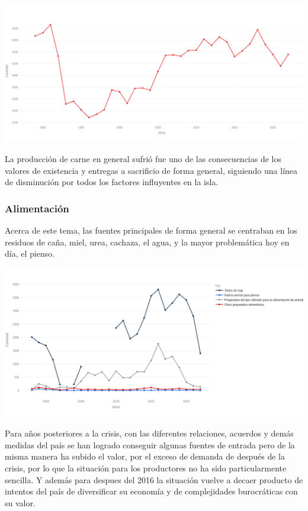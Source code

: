 \documentclass{article}
\begin{document}
\begin{center}
    \includegraphics[width=1.0\textwidth]{img/11.png}
\end{center}
La producción de carne en general sufrió fue uno de las consecuencias de los valores de existencia y entregas a sacrificio de forma general, siguiendo una línea de disminución por todos los factores influyentes en la isla.
\newpage
\subsubsection{Alimentación}
Acerca de este tema, las fuentes principales de forma general se centraban en los residuos de caña, miel, urea, cachaza, el agua, y la mayor problemática hoy en día, el pienso.
\begin{center}
    \includegraphics[width=1.0\textwidth]{img/1.png}
\end{center}
Para años posteriores a la crisis, con las diferentes relaciones, acuerdos y demás medidas del país se han logrado conseguir algunas fuentes de entrada pero de la misma manera ha subido el valor, por el exceso de demanda de después de la crisis, por lo que la situación 
para los productores no ha sido particularmente sencilla. Y además para despues del 2016 la situación vuelve a decaer producto de intentos del país de diversificar su economía y de complejidades burocráticas con su valor.
\end{document}
